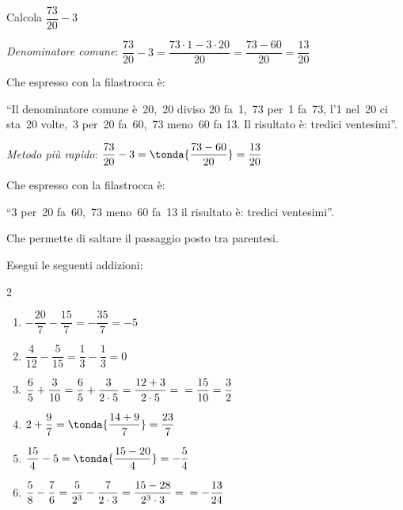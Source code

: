 \begin{esempio}{}{} Calcola 
\(\dfrac{73}{20} - 3\)

\vspace{1em}
\emph{Denominatore comune}: \quad
\(\dfrac{73}{20} - 3 = \dfrac{73 \cdot 1 - 3 \cdot 20}{20} =
  \dfrac{73 - 60}{20} = \dfrac{13}{20}\)

Che espresso con la filastrocca è: 

``Il denominatore comune è~20,~20 diviso 20 fa~1,~73 per~1 fa~73, 
l'1 nel~20 ci sta~20 volte,~3 per~20 fa~60,~73 meno~60 fa 13.
Il risultato è: tredici ventesimi''.

\vspace{1em}
\emph{Metodo più rapido}: \quad
\(\dfrac{73}{20} - 3 = \tonda{\dfrac{73 - 60}{20}} = \dfrac{13}{20}\)

Che espresso con la filastrocca è: 

``3 per~20 fa~60,~73 meno~60 fa~13 il risultato è: tredici ventesimi''.

Che permette di saltare il passaggio posto tra parentesi.
\end{esempio}

\begin{esempio}{}{}
 Esegui le seguenti addizioni:
 \begin{htmulticols}{2}
 \begin{enumerate} %
  \item \(-\dfrac{20}{7} -\dfrac{15}{7} = -\dfrac{35}{7} = -5\)
  \item \(\dfrac{4}{12} - \dfrac{5}{15} = \dfrac{1}{3} - \dfrac{1}{3} = 0\)
  \item \(\dfrac{6}{5} + \dfrac{3}{10} = 
          \dfrac{6}{5} + \dfrac{3}{2 \cdot 5} = \dfrac{12 + 3}{2 \cdot 5} = 
          \newline = \dfrac{15}{10} = \dfrac{3}{2}\)
  \item \(2 + \dfrac{9}{7} = \tonda{\dfrac{14 + 9}{7}} = \dfrac{23}{7}\)
  \item \(\dfrac{15}{4} - 5 = \tonda{\dfrac{15 - 20}{4}} = -\dfrac{5}{4}\)
  \item \(\dfrac{5}{8} - \dfrac{7}{6} = 
          \dfrac{5}{2^3} - \dfrac{7}{2 \cdot 3} = 
          \dfrac{15 - 28}{2^3 \cdot 3} = \newline = -\dfrac{13}{24}\)
 \end{enumerate}
 \end{htmulticols}
\end{esempio}


